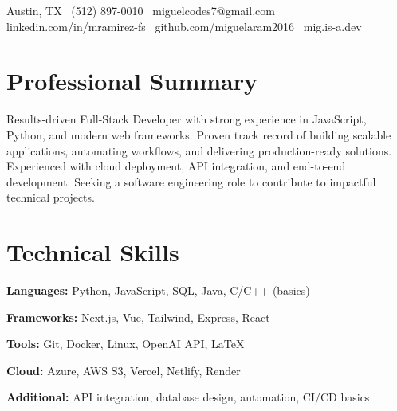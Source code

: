\documentclass[letterpaper,10pt]{article}
\begin{document}
\vspace{15pt}
 \vspace{8pt}
\begin{flushleft}
  Austin, TX \textbar\ (512) 897-0010 \textbar\ miguelcodes7@gmail.com \\
  linkedin.com/in/mramirez-fs \textbar\ github.com/miguelaram2016 \textbar\ mig.is-a.dev
\end{flushleft}
\vspace{6pt}

\section*{Professional Summary}
\begin{compactitem}
  \item[]
    Results-driven Full-Stack Developer with strong experience in JavaScript, Python, and modern web frameworks. Proven track record of building scalable applications, automating workflows, and delivering production-ready solutions. Experienced with cloud deployment, API integration, and end-to-end development. Seeking a software engineering role to contribute to impactful technical projects.
\end{compactitem}

\section*{Technical Skills}
\begin{compactitem}
  \item[]
    \textbf{Languages:} Python, JavaScript, SQL, Java, C/C++ (basics)
    \item[]
    \textbf{Frameworks:} Next.js, Vue, Tailwind, Express, React
    \item[]
    \textbf{Tools:} Git, Docker, Linux, OpenAI API, LaTeX
    \item[]
    \textbf{Cloud:} Azure, AWS S3, Vercel, Netlify, Render
    \item[]
    \textbf{Additional:} API integration, database design, automation, CI/CD basics
\end{compactitem}
\end{document}
